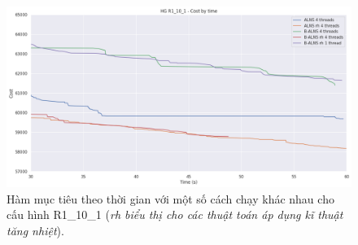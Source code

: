 \begin{figure}[H] %
  \centering %
  \includegraphics[width=1\textwidth]{figures/cost_time_R1_10_1_rh.png} 
  \caption{Hàm mục tiêu theo thời gian với một số cách chạy khác nhau cho cấu hình R1\_10\_1 (\textit{rh biểu thị cho các thuật toán áp dụng kĩ thuật tăng nhiệt}).} 
  \label{fig:reheat1}
\end{figure}
